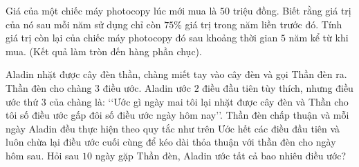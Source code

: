 \begin{ex}%
	Giá của một chiếc máy photocopy lúc mới mua là $50$ triệu đồng. Biết rằng giá trị của nó sau mỗi năm sử dụng chỉ còn $75\%$ giá  trị trong năm liền trước đó. Tính giá trị còn lại của chiếc máy photocopy đó sau khoảng thời gian $5$ năm kể từ khi mua. (Kết quả làm tròn đến hàng phần chục).
\end{ex}

\begin{ex}%
	Aladin nhặt được cây đèn thần, chàng  miết tay vào cây đèn và gọi Thần đèn ra. Thần đèn cho chàng $3$ điều ước. Aladin ước $2$ điều đầu tiên tùy thích, nhưng điều ước thứ $3$ của chàng là: \lq\lq Ước gì ngày mai tôi lại nhặt được cây đèn và Thần cho tôi số điều ước gấp đôi số điều ước ngày hôm nay\rq\rq. Thần đèn chấp thuận và mỗi ngày Aladin đều thực hiện theo quy tắc như trên Ước hết các điều đầu tiên và luôn chừa lại điều ước cuối cùng để kéo dài thỏa thuận với thần đèn cho ngày hôm sau. Hỏi sau $10$ ngày gặp Thần đèn, Aladin ước tất cả bao nhiêu điều ước?
\end{ex}

